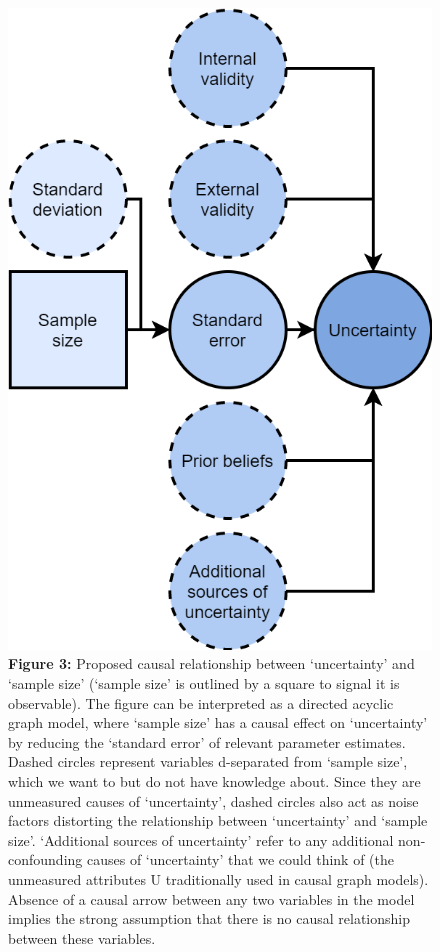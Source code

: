 \documentclass[
  english,
  jou,floatsintext]{apa6}
\begin{document}
\begin{figure}
\centering
\includegraphics{figure_3.png}
\caption{\textbf{Figure 3:} Proposed causal relationship between `uncertainty' and `sample size' (`sample size' is outlined by a square to signal it is observable). The figure can be interpreted as a directed acyclic graph model, where `sample size' has a causal effect on `uncertainty' by reducing the `standard error' of relevant parameter estimates. Dashed circles represent variables d-separated from `sample size', which we want to but do not have knowledge about. Since they are unmeasured causes of `uncertainty', dashed circles also act as noise factors distorting the relationship between `uncertainty' and `sample size'. `Additional sources of uncertainty' refer to any additional non-confounding causes of `uncertainty' that we could think of (the unmeasured attributes U traditionally used in causal graph models). Absence of a causal arrow between any two variables in the model implies the strong assumption that there is no causal relationship between these variables. \label{fig:3}}
\end{figure}
\end{document}
